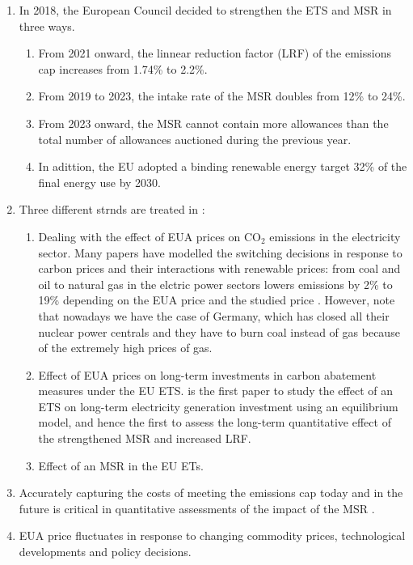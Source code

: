 \begin{enumerate}[wide, itemsep=0cm, topsep=0cm, label=\textbf{\arabic{enumi}.}]
	\item In 2018, the European Council decided to strengthen the ETS and MSR in three ways. 
	\begin{enumerate}[wide, itemsep=0cm, topsep=0cm, labelindent=2cm]
		\item From 2021 onward, the linnear reduction factor (LRF) of the emissions cap increases from 1.74\% to 2.2\%.
		\item From 2019 to 2023, the intake rate of the MSR doubles from 12\% to 24\%.
		\item From 2023 onward, the MSR cannot contain more allowances than the total number of allowances auctioned during the previous year.
		\item In adittion, the EU adopted a binding renewable energy target 32\% of the final energy use by 2030.
	\end{enumerate}
	\item Three different strnds are treated in \cite{bruninx2020long}:
	\begin{enumerate}[wide,itemsep=0cm, topsep=0cm, labelindent*=2cm]
		\item Dealing with the effect of EUA prices on CO$_2$ emissions in the electricity sector. Many papers have modelled the switching decisions in response to carbon prices and their interactions with renewable prices: from coal and oil to natural gas in the elctric power sectors lowers \cotwo emissions by 2\% to 19\% depending on the EUA price and the studied price \cite{bruninx2020long}. However, note that nowadays we have the case of Germany, which has closed all their nuclear power centrals and they have to burn coal instead of gas because of the extremely high prices of gas. 
		\item Effect of EUA prices on long-term investments in carbon abatement measures under the EU ETS. \cite{bruninx2020long} is the first paper to study the effect of an ETS on long-term electricity generation investment using an equilibrium model, and hence the first to assess the long-term quantitative effect of the strengthened MSR and increased LRF.
		\item Effect of an MSR in the EU ETs.
 	\end{enumerate}
 	\item Accurately capturing the costs of meeting the emissions cap today and in the future is critical in quantitative assessments of the impact of the MSR \cite{bruninx2020long}.
 	\item EUA price fluctuates in response to changing commodity prices, technological developments and policy decisions. 

\end{enumerate}
